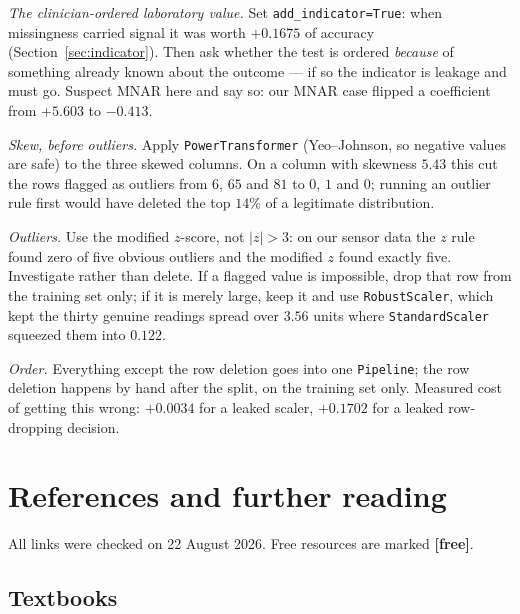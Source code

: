 \documentclass[11pt]{article}
\begin{document}
\emph{The clinician-ordered laboratory value.} Set
\texttt{add\_indicator=True}: when missingness carried signal it was worth
$+0.1675$ of accuracy (Section~\ref{sec:indicator}). Then ask whether the test
is ordered \emph{because} of something already known about the outcome --- if
so the indicator is leakage and must go. Suspect MNAR here and say so: our MNAR
case flipped a coefficient from $+5.603$ to $-0.413$.

\emph{Skew, before outliers.} Apply \texttt{PowerTransformer} (Yeo--Johnson, so
negative values are safe) to the three skewed columns. On a column with
skewness $5.43$ this cut the rows flagged as outliers from $6$, $65$ and $81$
to $0$, $1$ and $0$; running an outlier rule first would have deleted the top
$14\%$ of a legitimate distribution.

\emph{Outliers.} Use the modified $z$-score, not $|z| > 3$: on our sensor data
the $z$ rule found zero of five obvious outliers and the modified $z$ found
exactly five. Investigate rather than delete. If a flagged value is impossible,
drop that row from the training set only; if it is merely large, keep it and
use \texttt{RobustScaler}, which kept the thirty genuine readings spread over
$3.56$ units where \texttt{StandardScaler} squeezed them into $0.122$.

\emph{Order.} Everything except the row deletion goes into one
\texttt{Pipeline}; the row deletion happens by hand after the split, on the
training set only. Measured cost of getting this wrong: $+0.0034$ for a leaked
scaler, $+0.1702$ for a leaked row-dropping decision.

\section{References and further reading}

All links were checked on 22 August 2026. Free resources are marked
\textbf{[free]}.

\subsection*{Textbooks}
\end{document}
